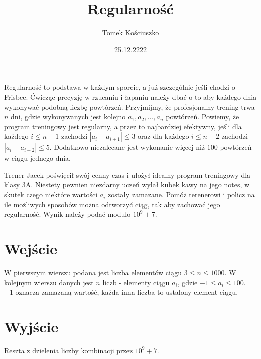\documentclass[zad,zawodnik,utf8]{sinol}
\title{Regularność}
\author{Tomek Kościuszko}
\date{25.12.2222}
\begin{document}
\begin{tasktext}%
    Regularność to podstawa w każdym sporcie, a już szczególnie jeśli chodzi o Frisbee. Ćwicząc precyzję w rzucaniu i łapaniu należy dbać o to aby każdego dnia wykonywać podobną liczbę powtórzeń. Przyjmijmy, że profesjonalny trening trwa $n$ dni, gdzie wykonywanych jest kolejno $a_{1}, a_{2},...,a_{n}$ powtórzeń. Powiemy, że program treningowy jest regularny, a przez to najbardziej efektywny, jeśli dla każdego $i \leq n - 1$ zachodzi $|a_{i} - a_{i + 1}| \leq 3$ oraz dla każdego $i \leq n - 2$ zachodzi $|a_{i} - a_{i + 2}| \leq 5$. Dodatkowo niezalecane jest wykonanie więcej niż $100$ powtórzeń w ciągu jednego dnia.

    Trener Jacek poświęcił swój cenny czas i ułożył idealny program treningowy dla klasy 3A. Niestety pewnien niezdarny uczeń wylał kubek kawy na jego notes, w skutek czego niektóre wartości $a_{i}$ zostały zamazane. Pomóż terenerowi i policz na ile możliwych sposobów można odtworzyć ciąg, tak aby zachować jego regularność. Wynik należy podać modulo $10^9+7$.

\section{Wejście}
    W pierwszym wierszu podana jest liczba elementów ciągu $3\leq n\leq 1000$.
    W kolejnym wierszu danych jest $n$ liczb - elementy ciągu $a_{i}$, gdzie $-1\leq a_{i}\leq 100$. $-1$ oznacza zamazaną wartość, każda inna liczba to ustalony element ciągu.

\section{Wyjście}
    Reszta z dzielenia liczby kombinacji przez $10^9+7$.




\end{tasktext}
\end{document}
